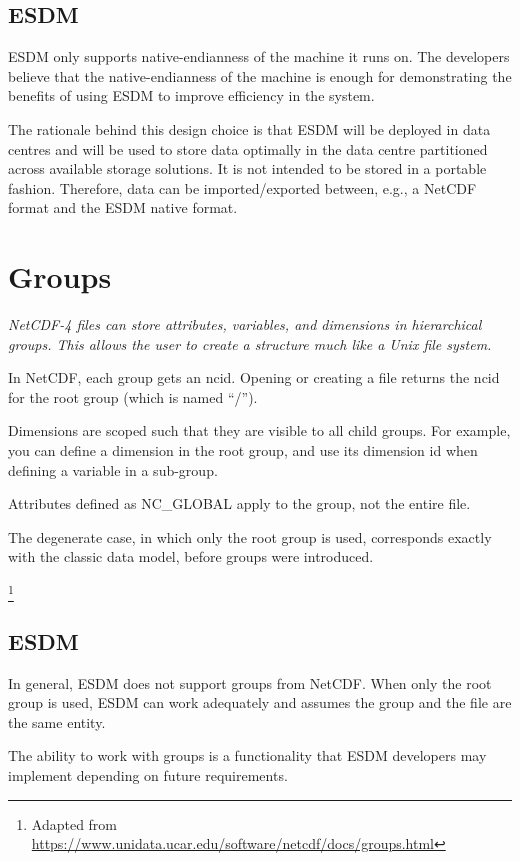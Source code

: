 \subsection{ESDM}

ESDM only supports native-endianness of the machine it runs on.
The developers believe that the native-endianness of the machine is enough for demonstrating the benefits of using ESDM to improve efficiency in the system.

The rationale behind this design choice is that ESDM will be deployed in data centres and will be used to store data optimally in the data centre partitioned across available storage solutions.
It is not intended to be stored in a portable fashion.
Therefore, data can be imported/exported between, e.g., a NetCDF format and the ESDM native format.

\section{Groups}

{\itshape
NetCDF-4 files can store attributes, variables, and dimensions in hierarchical groups.
This allows the user to create a structure much like a Unix file system.

In NetCDF, each group gets an ncid.
Opening or creating a file returns the ncid for the root group (which is named ``/'').

Dimensions are scoped such that they are visible to all child groups. For example, you can define a dimension in the root group, and use its dimension id when defining a variable in a sub-group.

Attributes defined as NC\_GLOBAL apply to the group, not the entire file.

The degenerate case, in which only the root group is used, corresponds exactly with the classic data model, before groups were introduced.
}\footnote{Adapted from \url{https://www.unidata.ucar.edu/software/netcdf/docs/groups.html}}

\subsection{ESDM}

In general, ESDM does not support groups from NetCDF.
When only the root group is used, ESDM can work adequately and assumes the group and the file are the same entity.

The ability to work with groups is a functionality that ESDM developers may implement depending on future requirements.

